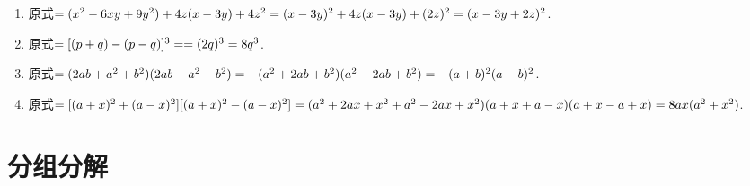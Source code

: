\documentclass[a4paper,12pt]{article}
\begin{document}
{\begin{multicols}{2}
\begin{enumerate}
	\item 原式$=( x ^ { 2 } - 6 x y + 9 y ^ { 2 } ) + 4 z ( x - 3 y ) + 4 z ^ { 2 } \\ = ( x - 3 y ) ^ { 2 } + 4 z ( x - 3 y ) + ( 2 z ) ^ { 2 } \\ = ( x - 3 y + 2 z ) ^ { 2 }$.
	
	\item 原式$=[ ( p + q ) - ( p - q ) ] ^ { 3 } = = ( 2 q ) ^ { 3 } \\ = 8q^3 $.
	
	\item 原式$=( 2 a b + a ^ { 2 } + b ^ { 2 } ) ( 2 a b - a ^ { 2 } - b ^ { 2 } ) \\ = - ( a ^ { 2 } + 2 a b + b ^ { 2 } ) ( a ^ { 2 } - 2 a b + b ^ { 2 } ) \\ = - ( a + b ) ^ { 2 } ( a - b ) ^ { 2 }$.
	
	\item 原式$=[ ( a + x ) ^ { 2 } + ( a - x ) ^ { 2 } ] [ ( a + x ) ^ { 2 } - ( a - x ) ^ { 2 } ] \\ = ( a ^ { 2 } + 2 a x + x ^ { 2 } + a ^ { 2 } - 2 a x + x ^ { 2 } ) ( a + x + a - x ) ( a + x - a + x ) \\ = 8 a x ( a ^ { 2 } + x ^ { 2 } )$.
\end{enumerate}
\end{multicols}
}

\section{分组分解}
\end{document}

